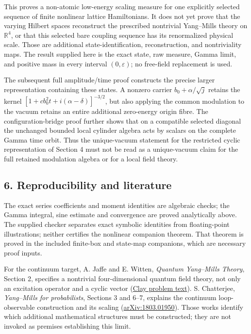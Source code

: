 \documentclass[
  11pt,
]{article}
\begin{document}
This proves a non-atomic low-energy scaling measure for one explicitly
selected sequence of finite nonlinear lattice Hamiltonians. It does not
yet prove that the varying Hilbert spaces reconstruct the prescribed
nontrivial Yang--Mills theory on \(\mathbb R^4\), or that this selected
bare coupling sequence has its renormalized physical scale. Those are
additional state-identification, reconstruction, and nontriviality maps.
The result supplied here is the exact state, raw measure, Gamma limit,
and positive mass in every interval \((0,\varepsilon)\); no free-field
replacement is used.

The subsequent full amplitude/time proof constructs the precise larger
representation containing these states. A nonzero carrier
\(b_0+\alpha/\sqrt j\) retains the kernel
\([1+cb_0^2t+i(\alpha-\delta)]^{-3/2}\), but also applying the common
modulation to the vacuum retains an entire additional zero-energy origin
fibre. The configuration-bridge proof further shows that on a compatible
selected diagonal the unchanged bounded local cylinder algebra acts by
scalars on the complete Gamma time orbit. Thus the unique-vacuum
statement for the restricted cyclic representation of Section 4 must not
be read as a unique-vacuum claim for the full retained modulation
algebra or for a local field theory.

\subsection{6. Reproducibility and
literature}\label{weak-coupling-part-4-reproducibility-and-literature}

The exact series coefficients and moment identities are algebraic
checks; the Gamma integral, sine estimate and convergence are proved
analytically above. The supplied checker separates exact symbolic
identities from floating-point illustrations; neither certifies the
nonlinear companion theorem. That theorem is proved in the included
finite-box and state-map companions, which are necessary proof inputs.

For the continuum target, A. Jaffe and E. Witten, \emph{Quantum
Yang--Mills Theory}, Section 2, specifies a nontrivial four-dimensional
quantum field theory, not only an excitation operator and a cyclic
vector
(\href{https://www.claymath.org/wp-content/uploads/2022/06/yangmills.pdf}{Clay
problem text}). S. Chatterjee, \emph{Yang--Mills for probabilists},
Sections 3 and 6--7, explains the continuum loop-observable construction
and its scaling
(\href{https://arxiv.org/abs/1803.01950}{arXiv:1803.01950}). Those works
identify which additional mathematical structures must be constructed;
they are not invoked as premises establishing this limit.
\end{document}
